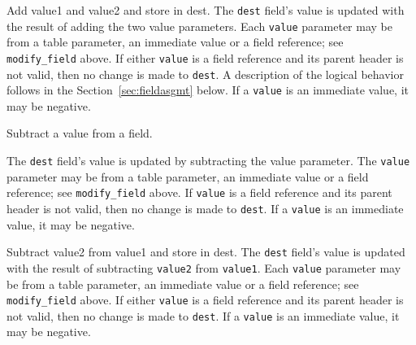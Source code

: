 \documentclass[12pt]{article}
\begin{document}

{ %
Add value1 and value2 and store in dest.
}
{ %
}
{ %
The \texttt{dest} field's value is updated with the result of adding
the two value parameters. Each \texttt{value} parameter may be from a
table parameter, an immediate value {\color{red}or a field reference}; see \texttt{modify_field} above.  If either \texttt{value}
is a field reference and its parent header is not valid, then no
change is made to \texttt{dest}.  A description of the logical
behavior follows in the Section~\ref{sec:fieldasgmt} below.  If a
\texttt{value} is an immediate value, it may be negative.
}


{ %
\color{red}Subtract a value from a field.
}
{ %
}
{ %
\color{red} 
The \texttt{dest} field's value is updated by subtracting the value parameter. The \texttt{value} parameter 
may be from a table parameter, an immediate value or a field reference; see \texttt{modify_field} above.  If \texttt{value} is a field reference 
and its parent header is not valid, then no change is made to \texttt{dest}. 
If a \texttt{value} is an immediate value, it may be negative.

}


{ %
\color{red}Subtract value2 from value1 and store in dest.
}
{ %
}
{ %
The \texttt{dest} field's value is updated with the result of subtracting
\texttt{value2} from \texttt{value1}. Each \texttt{value} parameter may be from a
table parameter, an immediate value or a field reference; see \texttt{modify_field} above.  If either \texttt{value}
is a field reference and its parent header is not valid, then no
change is made to \texttt{dest}. If a
\texttt{value} is an immediate value, it may be negative.
}
\end{document}
